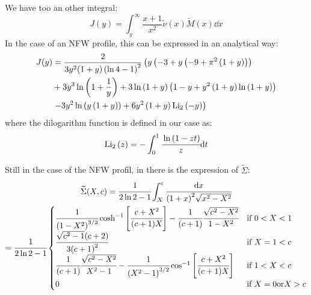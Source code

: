 %
We have too an other integral:
%
\begin{equation}
    J(y)=\int_y^{\infty}\frac{x+1}{x^2}\widetilde{\nu}{(x)}\widetilde{M}{(x)}\dd{x}
\end{equation}
%
In the case of an NFW profile, this can be expressed in an analytical way:
%
\begin{align*}
    J(y)&=\frac{2}{3{y^2}(1+y)\left(\ln{4}-1\right)^2}\left({y}\left(-3+y\left(-9+\pi^2\left(1+y\right)\right)\right)\right.\\
    &+3{y^3}\ln\left(1+\frac{1}{y}\right)+3\ln\left(1+y\right)\left(1-y+y^2\left(1+y\right)\ln\left(1+y\right)\right)\\
    &\left.-3{y^2}\ln\left({y}\left(1+y\right)\right)+6{y^2}\left(1+y\right){\mathrm{Li}_2\left(-y\right)}\right)\\
\end{align*}
%
where the dilogarithm function is defined in our case as:
%
\begin{equation}
    \mathrm{Li}_2\left(z\right)=-\int_0^1\cfrac{\ln{(1-zt)}}{z}{\rm{d}}{t}
\end{equation}

Still in the case of the NFW profil, in \citet{MBM10} there is the expression
of $\widetilde{\Sigma}$:
%
\begin{multline}
    \widetilde{\Sigma}(X,c)=\cfrac{1}{2\ln2-1}\int_X^c\cfrac{{\rm{d}}{x}}{{(1+x)}^2\sqrt{x^2-X^2}}\\
    =\cfrac{1}{2\ln2-1}\begin{cases}
        \cfrac{1}{{(1-X^2)}^{3/2}}
        \cosh^{-1}\left[\cfrac{c+X^2}{(c+1)X}\right]-
        \cfrac{1}{(c+1)}\cfrac{\sqrt{c^2-X^2}}{1-X^2} &\text{if } 0<X<1 \\
    \cfrac{\sqrt{c^2-1}(c+2)}{3{(c+1)}^2} &\text{if } X=1<c\\
    \cfrac{1}{(c+1)}\cfrac{\sqrt{c^2-X^2}}{X^2-1}-
    \cfrac{1}{{(X^2-1)}^{3/2}}
    \cos^{-1}\left[\cfrac{c+X^2}{(c+1)X}\right] &\text{if } 1<X<c\\
    0 &\text{if } X=0\text{or}X>c
    \end{cases}
\end{multline}
